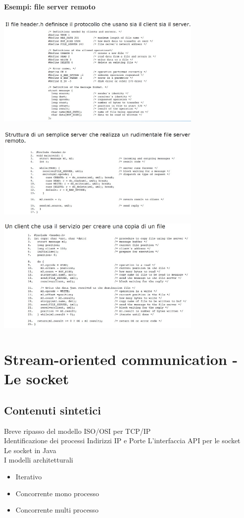 \subsubsection{Esempi: file server remoto}
\begin{center}
    \includegraphics[width=0.75\textwidth]{img/es_serverRemoto1.jpg}
\end{center}
\begin{center}
    \includegraphics[width=0.75\textwidth]{img/es_serverRemoto2.jpg}
\end{center}
\begin{center}
    \includegraphics[width=0.75\textwidth]{img/es_serverRemoto3.jpg}
\end{center}

\chapter{Stream-oriented communication - Le socket}
\section{Contenuti sintetici}
Breve ripasso del modello ISO/OSI per TCP/IP
\\Identificazione dei processi
Indirizzi IP e Porte
L'interfaccia API per le socket
\\Le socket in Java
\\I modelli architetturali
\begin{itemize}
    \item Iterativo
    \item Concorrente mono processo
    \item Concorrente multi processo
\end{itemize}

